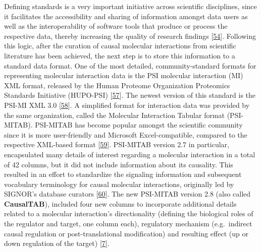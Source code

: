 \documentclass[
  12pt,
]{book}
\begin{document}
Defining standards is a very important initiative across scientific disciplines, since it facilitates the accessibility and sharing of information amongst data users as well as the interoperability of software tools that produce or process the respective data, thereby increasing the quality of research findings {[}\protect\hyperlink{ref-Wilkinson2016}{54}{]}.
Following this logic, after the curation of causal molecular interactions from scientific literature has been achieved, the next step is to store this information to a standard data format.
One of the most detailed, community-standard formats for representing molecular interaction data is the PSI molecular interaction (MI) XML format, released by the Human Proteome Organization Proteomics Standards Initiative (HUPO-PSI) {[}\protect\hyperlink{ref-Hermjakob2004}{57}{]}.
The newest version of this standard is the PSI-MI XML 3.0 {[}\protect\hyperlink{ref-Sivade2018}{58}{]}.
A simplified format for interaction data was provided by the same organization, called the Molecular Interaction Tabular format (PSI-MITAB).
PSI-MITAB has become popular amongst the scientific community since it is more user-friendly and Microsoft Excel-compatible, compared to the respective XML-based format {[}\protect\hyperlink{ref-Kerrien2007}{59}{]}.
PSI-MITAB version 2.7 in particular, encapsulated many details of interest regarding a molecular interaction in a total of 42 columns, but it did not include information about its causality.
This resulted in an effort to standardize the signaling information and subsequent vocabulary terminology for causal molecular interactions, originally led by SIGNOR's database curators {[}\protect\hyperlink{ref-Licata2019}{60}{]}.
The new PSI-MITAB version 2.8 (also called \textbf{CausalTAB}), included four new columns to incorporate additional details related to a molecular interaction's directionality (defining the biological roles of the regulator and target, one column each), regulatory mechanism (e.g.~indirect causal regulation or post-translational modification) and resulting effect (up or down regulation of the target) {[}\protect\hyperlink{ref-Perfetto2019}{7}{]}.
\end{document}
